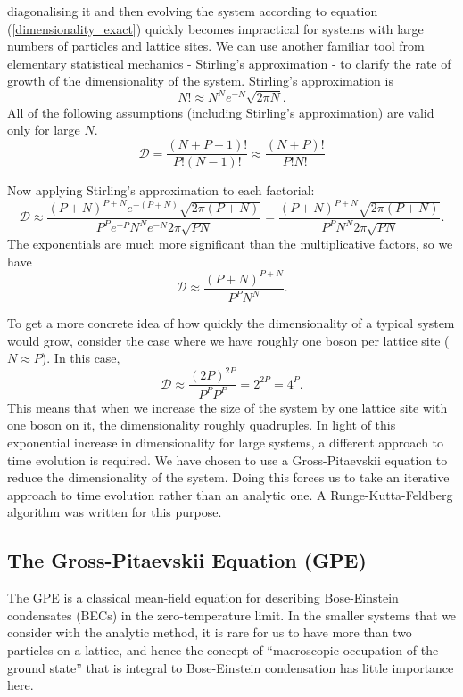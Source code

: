 \documentclass[a4paper,10pt]{article}
\theoremstyle{plain}
\begin{document}
diagonalising it and then evolving the system according to equation 
(\ref{dimensionality_exact}) quickly becomes impractical for systems with large 
numbers of particles and lattice sites. We can use another familiar tool from
elementary statistical mechanics - Stirling's approximation - to clarify the
rate of growth of the dimensionality of the system. Stirling's 
approximation \cite{Schroeder2007} is
\begin{equation}
 N!\approx N^N e^{-N}\sqrt{2\pi N}.
\end{equation}
All of the following assumptions (including Stirling's approximation) are 
valid only for large $N$.
\begin{equation*}
 \mathcal{D}
 =
 \frac{\left(N+P-1\right)!}{P!\left(N-1\right)!}
 \approx
 \frac{\left(N+P\right)!}{P!N!}
\end{equation*}

Now applying Stirling's approximation to each factorial:
\begin{equation*}
 \mathcal{D} 
 \approx
 \frac{\left(P+N\right)^{P+N}e^{-\left(P+N\right)}\sqrt{2\pi(P+N)}}
 {P^P e^{-P} N^N e^{-N} 2\pi \sqrt{PN}}
 =
 \frac{\left(P+N\right)^{P+N}\sqrt{2\pi(P+N)}}
 {P^P N^N 2\pi \sqrt{PN}}.
\end{equation*}
The exponentials are much more significant than the multiplicative factors,
so we have
\begin{equation*}
 \mathcal{D} 
 \approx
 \frac{\left(P+N\right)^{P+N}}
 {P^P N^N}.
\end{equation*}

To get a more concrete idea of how quickly the dimensionality of a typical 
system would grow, consider the case where we have roughly one boson per
lattice site ($N\approx P$). In this case,
\begin{equation*}
 \mathcal{D}
 \approx
 \frac{(2P)^{2P}}{P^P P^P}
 =
 2^{2P}=4^P.
\end{equation*}
This means that when we increase the size of the system by one lattice site 
with one boson on it, the dimensionality roughly quadruples. In light of
this exponential increase in dimensionality for large systems, a different 
approach to time evolution is required. We have chosen to use a 
Gross-Pitaevskii equation to reduce the dimensionality of the system. Doing 
this forces us to take an iterative approach to time evolution rather than an 
analytic one. A Runge-Kutta-Feldberg algorithm \cite{Burden2005} was written 
for this purpose.

\subsection{The Gross-Pitaevskii Equation (GPE)}
The GPE is a classical mean-field equation for describing Bose-Einstein 
condensates (BECs) in the zero-temperature limit. In the smaller systems that 
we consider with the analytic method, it is rare for us to have more than two 
particles on a lattice, and hence the concept of ``macroscopic occupation of 
the ground state'' that is integral to Bose-Einstein condensation has little 
importance here. 
\end{document}
